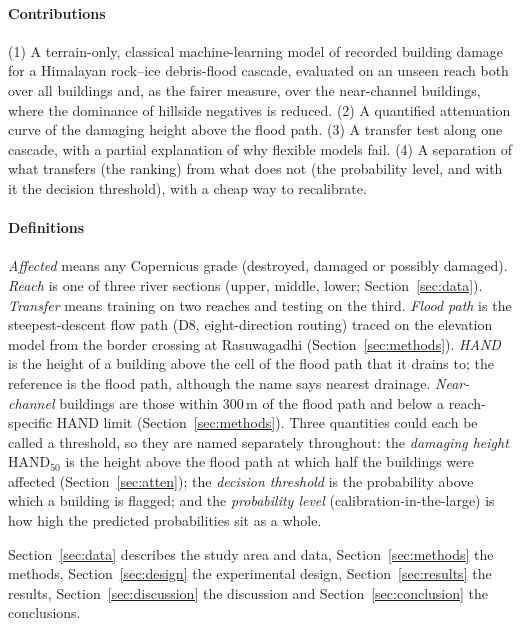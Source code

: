 \documentclass[journal,a4paper]{IEEEtran}
\begin{document}
\paragraph{Contributions} (1) A terrain-only, classical machine-learning model of recorded building damage for a Himalayan rock--ice debris-flood cascade, evaluated on an unseen reach both over all buildings and, as the fairer measure, over the near-channel buildings, where the dominance of hillside negatives is reduced. (2) A quantified attenuation curve of the damaging height above the flood path. (3) A transfer test along one cascade, with a partial explanation of why flexible models fail. (4) A separation of what transfers (the ranking) from what does not (the probability level, and with it the decision threshold), with a cheap way to recalibrate.

\paragraph{Definitions} \emph{Affected} means any Copernicus grade (destroyed, damaged or possibly damaged). \emph{Reach} is one of three river sections (upper, middle, lower; Section~\ref{sec:data}). \emph{Transfer} means training on two reaches and testing on the third. \emph{Flood path} is the steepest-descent flow path (D8, eight-direction routing) traced on the elevation model from the border crossing at Rasuwagadhi (Section~\ref{sec:methods}). \emph{HAND} is the height of a building above the cell of the flood path that it drains to; the reference is the flood path, although the name says nearest drainage. \emph{Near-channel} buildings are those within 300\,m of the flood path and below a reach-specific HAND limit (Section~\ref{sec:methods}). Three quantities could each be called a threshold, so they are named separately throughout: the \emph{damaging height} HAND$_{50}$ is the height above the flood path at which half the buildings were affected (Section~\ref{sec:atten}); the \emph{decision threshold} is the probability above which a building is flagged; and the \emph{probability level} (calibration-in-the-large) is how high the predicted probabilities sit as a whole.

Section~\ref{sec:data} describes the study area and data, Section~\ref{sec:methods} the methods, Section~\ref{sec:design} the experimental design, Section~\ref{sec:results} the results, Section~\ref{sec:discussion} the discussion and Section~\ref{sec:conclusion} the conclusions.
\end{document}

